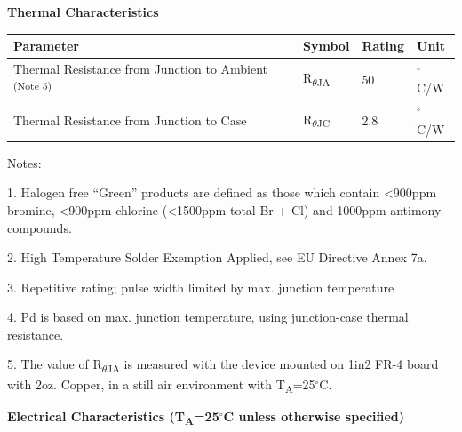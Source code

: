 \documentclass[a4paper]{article}
\newcommand{\sectiontitle}[1]{{\fontsize{10}{12.6}\selectfont\textbf{#1}}}
\newcommand{\defaultsize}{\fontsize{9}{12}\selectfont}
\newcommand{\smallnote}{\fontsize{7}{8.4}\selectfont}
\begin{document}
\vspace{12pt}

\sectiontitle{Thermal Characteristics}

\defaultsize
\begin{center}
\begin{tabularx}{\linewidth}{|P{2.74}|Q{0.40}|Q{0.63}|Q{0.23}|}
\hline
{} \textbf{Parameter} & \textbf{Symbol} & \textbf{Rating} & \textbf{Unit} \\
\hline
Thermal Resistance from Junction to Ambient \textsuperscript{(Note 5)} & R\textsubscript{$\theta$JA} & 50 & $^\circ$C/W \\
\hline
Thermal Resistance from Junction to Case & R\textsubscript{$\theta$JC} & 2.8 & $^\circ$C/W \\
\hline
\end{tabularx}
\end{center}

\vspace{12pt}

\smallnote
Notes:

1. Halogen free ``Green'' products are defined as those which contain \textless{}900ppm bromine, \textless{}900ppm chlorine (\textless{}1500ppm total Br + Cl) and 1000ppm antimony compounds.

2. High Temperature Solder Exemption Applied, see EU Directive Annex 7a.

3. Repetitive rating; pulse width limited by max. junction temperature

4. Pd is based on max. junction temperature, using junction-case thermal resistance.

5. The value of R\textsubscript{$\theta$JA} is measured with the device mounted on 1in2 FR-4 board with 2oz. Copper, in a still air environment with T\textsubscript{A}=25$^\circ$C.

\newpage

\sectiontitle{Electrical Characteristics (T\textsubscript{A}=25$^\circ$C unless otherwise specified)}
\end{document}
